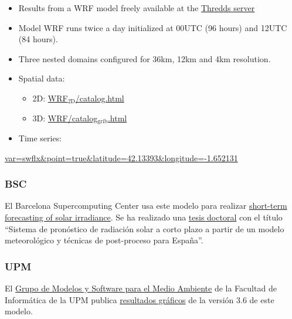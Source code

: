 \documentclass[11pt]{article}
\begin{document}
\begin{itemize}
\item Results from a WRF model freely available at the \href{http://www.meteogalicia.es/web/modelos/threddsIndex.action}{Thredds server}

\item Model WRF runs twice a day initialized at 00UTC (96 hours) and
12UTC (84 hours).

\item Three nested domains configured for 36km, 12km and 4km
resolution.

\item Spatial data:

\begin{itemize}
\item 2D: \href{http://mandeo.meteogalicia.es/thredds/catalogos/WRF_2D/catalog.html}{WRF$_{\text{2D}}$/catalog.html}

\item 3D: \href{http://mandeo.meteogalicia.es/thredds/catalogos/WRF/catalog_grib.html}{WRF/catalog$_{\text{grib}}$.html}
\end{itemize}

\item Time series:
\end{itemize}
\href{http://mandeo.meteogalicia.es/thredds/ncss/grid/wrf_2d_12km/fmrc/files/20130319/wrf_arw_det_history_d02_20130319_0000.nc4?var=swflx&point=true&latitude=42.13393&longitude=-1.652131}{var=swflx\&point=true\&latitude=42.13393\&longitude=-1.652131}

\subsubsection{BSC}
\label{sec-2-2-4}
El Barcelona Supercomputing Center usa este modelo para realizar
\href{http://www.wire1002.ch/fileadmin/user_upload/Major_events/WS_Nice_2011/Spec._presentations/Jorba.pdf}{short-term forecasting of solar irradiance}. Se ha realizado una \href{http://www.tdx.cat/handle/10803/129515}{tesis
doctoral} con el título ``Sistema de pronóstico de radiación solar a
corto plazo a partir de un modelo meteorológico y técnicas de
post-proceso para España''.

\subsubsection{UPM}
\label{sec-2-2-5}
El \href{http://artico.lma.fi.upm.es/}{Grupo de Modelos y Software para el Medio Ambiente} de la
Facultad de Informática de la UPM publica \href{http://atmosfera.lma.fi.upm.es/mm5v3.6/}{resultados gráficos} de
la versión 3.6 de este modelo.
\end{document}
